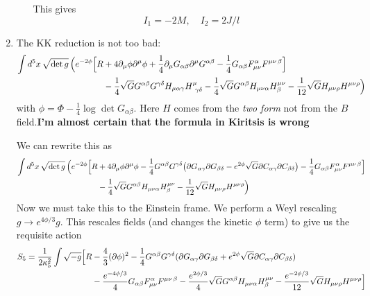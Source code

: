 \documentclass[11pt, class=article, crop=false]{standalone}
\begin{document}
\begin{enumerate}
\begin{enumerate}
		This gives 
		\[
			I_1 = -2 M, \quad  I_2 = 2 J / l
		\]
	\end{enumerate}
	
	\item The KK reduction is not too bad:
	\[
	\begin{aligned}
		\int d^5 x \, \sqrt{\det g} \, \Big(e^{-2\phi} \Big[R &+ 4 \partial_\mu \phi \partial^\mu \phi + \frac14 \partial_\mu G_{\alpha \beta} \partial^\mu G^{\alpha \beta} - \frac14  G_{\alpha \beta} F_{\mu \nu}^\alpha F^{\mu \nu\, \beta} \Big] \\
		& - \frac14 \sqrt{G} G^{\alpha \beta} G^{\gamma \delta} H_{\mu \alpha \gamma} H^\mu_{\ \gamma \delta} - \frac14 \sqrt{G} G^{\alpha \beta} H_{\mu \nu \alpha} H^{\mu \nu}_\beta - \frac{1}{12} \sqrt{G} H_{\mu \nu \rho} H^{\mu \nu \rho}  \Big)
	\end{aligned}
	\]
	with $\phi = \Phi - \frac14 \log \det G_{\alpha \beta}$. 
	Here $H$ comes from the \emph{two form} not from the $B$ field.\textbf{I'm almost certain that the formula in Kiritsis is wrong }
	
	 We can rewrite this as
	\[
	\begin{aligned}
			\int d^5 x \, \sqrt{\det g} \, \Big(e^{-2\phi} \Big[R &+ 4 \partial_\mu \phi \partial^\mu \phi - \frac14 G^{\alpha \beta} G^{\gamma \delta} \big(  \partial G_{\alpha \gamma} \partial G_{\beta \delta} - e^{2\phi} \sqrt{G} \partial C_{\alpha \gamma} \partial C_{\beta \delta}  \big) -  \frac14  G_{\alpha \beta} F_{\mu \nu}^\alpha F^{\mu \nu\, \beta} \Big] \\
			& - \frac14 \sqrt{G} G^{\alpha \beta} H_{\mu \nu \alpha} H^{\mu \nu}_\beta - \frac{1}{12} \sqrt{G} H_{\mu \nu \rho} H^{\mu \nu \rho}  \Big)
		\end{aligned}
	\]
	Now we must take this to the Einstein frame. We perform a Weyl rescaling $g \to e^{4\phi/3} g$. This rescales fields (and changes the kinetic $\phi$ term) to give us the requisite action
	\[
	\begin{aligned}
		S_5 = \frac{1}{2 \kappa_5^2} \int \sqrt{-g} \Big[R &- \frac43 (\partial \phi)^2 - \frac14 G^{\alpha \beta} G^{\gamma \delta} (\partial G_{\alpha \gamma} \partial G_{\beta \delta} + e^{2\phi} \sqrt{G} \partial C_{\alpha \gamma} \partial C_{\beta \delta})\\
		& - \frac{e^{-4 \phi/3}}{4} G_{\alpha \beta} F_{\mu \nu}^\alpha F^{\mu \nu\, \beta} - \frac{e^{2\phi /3}}{4} \sqrt{G} G^{\alpha \beta} H_{\mu \nu \alpha} H^{\mu \nu}_\beta - \frac{e^{-2 \phi/3}}{12} \sqrt{G} H_{\mu \nu \rho} H^{\mu \nu \rho}  \Big]
	\end{aligned}
	\]
	

\end{enumerate}
\end{document}
